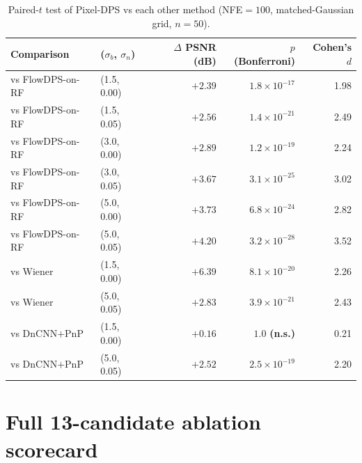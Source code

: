 \documentclass{article}
\begin{document}
\begin{table}[h]
  \centering
  \caption{Paired-$t$ test of Pixel-DPS vs each other method
    (NFE${=}100$, matched-Gaussian grid, $n{=}50$).}
  \label{tab:significance_full}
  \small
  \begin{tabular}{llrrr}
    \toprule
    Comparison & ($\sigma_b$, $\sigma_n$) & $\Delta$ PSNR (dB) & $p$ (Bonferroni) & Cohen's $d$ \\
    \midrule
    vs FlowDPS-on-RF & (1.5, 0.00) & $+2.39$ & $1.8\times10^{-17}$ & 1.98 \\
    vs FlowDPS-on-RF & (1.5, 0.05) & $+2.56$ & $1.4\times10^{-21}$ & 2.49 \\
    vs FlowDPS-on-RF & (3.0, 0.00) & $+2.89$ & $1.2\times10^{-19}$ & 2.24 \\
    vs FlowDPS-on-RF & (3.0, 0.05) & $+3.67$ & $3.1\times10^{-25}$ & 3.02 \\
    vs FlowDPS-on-RF & (5.0, 0.00) & $+3.73$ & $6.8\times10^{-24}$ & 2.82 \\
    vs FlowDPS-on-RF & (5.0, 0.05) & $+4.20$ & $3.2\times10^{-28}$ & 3.52 \\
    \midrule
    vs Wiener        & (1.5, 0.00) & $+6.39$ & $8.1\times10^{-20}$ & 2.26 \\
    vs Wiener        & (5.0, 0.05) & $+2.83$ & $3.9\times10^{-21}$ & 2.43 \\
    \midrule
    vs DnCNN$+$PnP   & (1.5, 0.00) & $+0.16$ & $\mathbf{1.0}$ \textbf{(n.s.)} & 0.21 \\
    vs DnCNN$+$PnP   & (5.0, 0.05) & $+2.52$ & $2.5\times10^{-19}$ & 2.20 \\
    \bottomrule
  \end{tabular}
\end{table}

\section{Full 13-candidate ablation scorecard}
\label{app:ablations}
\end{document}
